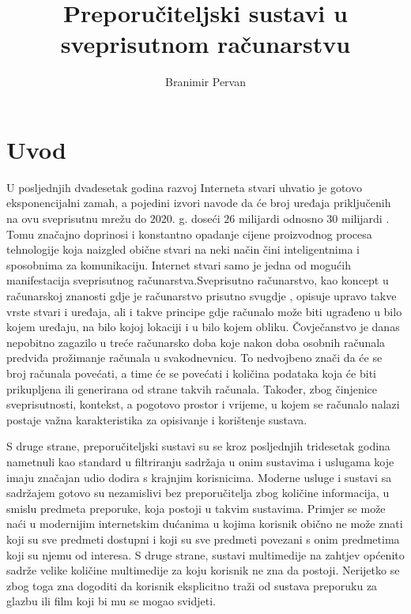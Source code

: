 \documentclass[times, utf8, diplomski, numeric]{fer}
\begin{document}
\title{Preporučiteljski sustavi u sveprisutnom računarstvu}
\author{Branimir Pervan}
\maketitle

\izvornik


\tableofcontents

\chapter{Uvod}
U posljednjih dvadesetak godina razvoj Interneta stvari  uhvatio je gotovo eksponencijalni zamah, a pojedini izvori navode da
će broj uređaja priključenih na ovu sveprisutnu mrežu do $2020$. g. doseći $26$
milijardi \cite{gartner2013Iot} odnosno $30$ milijardi \cite{ABI2013Iot}. Tomu
značajno doprinosi i konstantno opadanje cijene proizvodnog procesa tehnologije
koja naizgled obične stvari na neki način čini inteligentnima i sposobnima za
komunikaciju. Internet stvari samo je jedna od mogućih manifestacija
sveprisutnog računarstva.Sveprisutno računarstvo, kao koncept u računarskoj
znanosti gdje je računarstvo prisutno svugdje \cite{theComputerWeiser}, opisuje
upravo takve vrste stvari i uređaja, ali i takve principe gdje računalo može
biti ugrađeno u bilo kojem uređaju, na bilo kojoj lokaciji i u bilo kojem
obliku. Čovječanstvo je danas nepobitno zagazilo u treće računarsko doba koje
nakon doba osobnih računala predviđa prožimanje računala u svakodnevnicu. To
nedvojbeno znači da će se broj računala povećati, a time će se povećati i
količina podataka koja će biti prikupljena ili generirana od strane takvih
računala. Također, zbog činjenice sveprisutnosti, kontekst, a pogotovo prostor i
vrijeme, u kojem se računalo nalazi postaje važna karakteristika za opisivanje i
korištenje sustava.

S druge strane, preporučiteljski sustavi su se kroz posljednjih tridesetak
godina nametnuli kao standard u filtriranju sadržaja u onim sustavima i uslugama
koje imaju značajan udio dodira s krajnjim korisnicima. Moderne usluge i sustavi
sa sadržajem gotovo su nezamislivi bez preporučitelja zbog količine informacija,
u smislu predmeta preporuke, koja postoji u takvim sustavima. Primjer se može
naći u modernijim internetskim dućanima u kojima korisnik obično ne može znati
koji su sve predmeti dostupni i koji su sve predmeti povezani s onim predmetima
koji su njemu od interesa. S druge strane, sustavi multimedije na zahtjev
 općenito sadrže velike količine multimedije za koju
korisnik ne zna da postoji. Nerijetko se zbog toga zna dogoditi da korisnik
eksplicitno traži od sustava preporuku za glazbu ili film koji bi mu se mogao
svidjeti.
\end{document}
